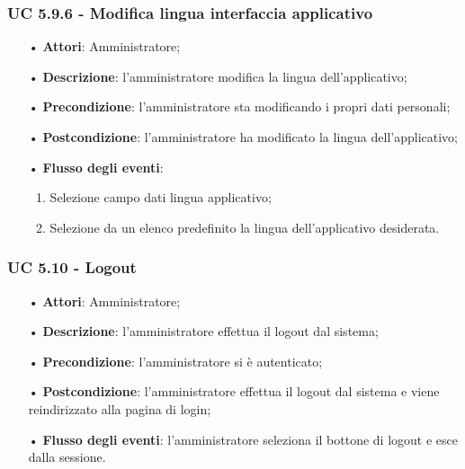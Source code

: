 \subsubsection{UC 5.9.6 - Modifica lingua interfaccia applicativo}
\begin{itemize}
	\item[•]\textbf{Attori}: Amministratore;
	\item[•]\textbf{Descrizione}: l'amministratore modifica la lingua dell'applicativo;
	\item[•]\textbf{Precondizione}: l'amministratore sta modificando i propri dati personali;
	\item[•]\textbf{Postcondizione}: l'amministratore ha modificato la lingua dell'applicativo; 
	\item[•]\textbf{Flusso degli eventi}: 
	\begin{enumerate}
		\item Selezione campo dati lingua applicativo;
		\item Selezione da un elenco predefinito la lingua dell'applicativo desiderata.
	\end{enumerate}
\end{itemize}
%

\subsubsection{UC 5.10 - Logout}
\begin{itemize}
    \item[•] \textbf{Attori}: Amministratore;
    \item[•] \textbf{Descrizione}:  l'amministratore effettua il logout dal sistema;
    \item[•] \textbf{Precondizione}: l'amministratore si è autenticato;
    \item[•] \textbf{Postcondizione}: l’amministratore effettua il logout dal sistema e viene reindirizzato alla pagina di login;
    \item[•] \textbf{Flusso degli eventi}: l’amministratore seleziona il bottone di logout e esce dalla sessione.
\end{itemize}



